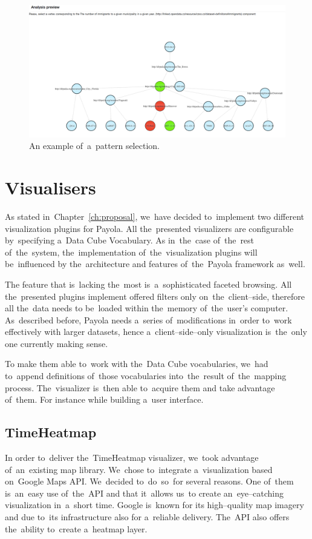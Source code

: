 \begin{figure}
	\centering
	\includegraphics[width=140mm]{img/pattern-selection.png}
	\caption{An example of~a~pattern selection.}
	\label{fig:pattern-selection}
\end{figure}

\section{Visualisers}
As stated in~Chapter~\ref{ch:proposal}, we~have decided to~implement two 
different visualization plugins for Payola. All the~presented 
visualizers are configurable by~specifying a~Data Cube Vocabulary.
As in~the~case of~the~rest of~the~system, the~implementation of~the~visualization plugins will be~influenced 
by the~architecture and features of~the~Payola framework as~well.

The feature that is~lacking the~most  is~a~sophisticated faceted browsing. All the~presented plugins 
implement offered filters only on~the~client--side, therefore all the~data needs 
to be~loaded within the~memory of~the~user’s computer. As~described before, Payola 
needs a~series of~modifications in~order to~work effectively with larger 
datasets, hence a~client--side--only visualization is~the~only one currently making sense.

To make them able to~work with the~Data Cube vocabularies, we~had to~append 
definitions of~those vocabularies into~the~result of~the~mapping process. The~visualizer is~then able to~acquire them and take advantage of~them. For instance 
while building a~user interface.

\subsection{TimeHeatmap}
In order to~deliver the~TimeHeatmap visualizer, we~took advantage of~an~existing 
map library. We~chose to~integrate a~visualization based on~Google Maps API. We~decided to~do~so~for several reasons. One of~them is~an~easy use of~the~API and that it~allows us~to
create an~eye--catching visualization in~a~short 
time. Google is~known for its high--quality map imagery and due to~its 
infrastructure also for a~reliable delivery. The~API also offers the~ability to~create a~heatmap layer.

